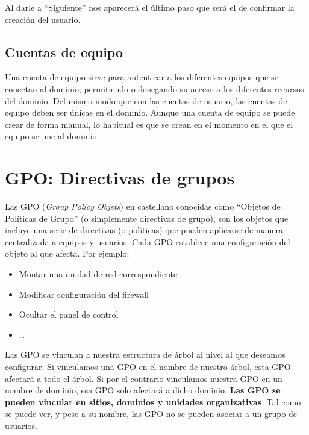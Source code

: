 Al darle a “Siguiente” nos aparecerá el último paso que será el de confirmar la creación del usuario.



\section{Cuentas de equipo}
Una cuenta de equipo sirve para autenticar a los diferentes equipos que se conectan al dominio, permitiendo o denegando su acceso a los diferentes recursos del dominio. Del mismo modo que con las cuentas de usuario, las cuentas de equipo deben ser únicas en el dominio. Aunque una cuenta de equipo se puede crear de forma manual, lo habitual es que se crean en el momento en el que el equipo se une al dominio.


\chapter{GPO: Directivas de grupos}

Las GPO (\textit{Group Policy Objets}) en castellano conocidas como “Objetos de Políticas de Grupo” (o simplemente directivas de grupo), son los objetos que incluye una serie de directivas (o políticas) que pueden aplicarse de manera centralizada a equipos y usuarios. Cada GPO  establece una configuración del objeto al que afecta. Por ejemplo:

\begin{itemize}
    \item Montar una unidad de red correspondiente
    \item Modificar configuración del firewall
    \item Ocultar el panel de control
    \item …
\end{itemize}


Las GPO se vinculan a nuestra estructura de árbol al nivel al que deseamos configurar. Si vinculamos una GPO en el nombre de nuestro árbol, esta GPO afectará a todo el árbol. Si por el contrario vinculamos nuestra GPO en un nombre de dominio, esa GPO solo afectará a dicho dominio. \textbf{Las GPO se pueden vincular en sitios, dominios y unidades organizativas}. Tal como se puede ver, y pese a su nombre, las GPO \underline{no se pueden asociar a un grupo de usuarios}.


